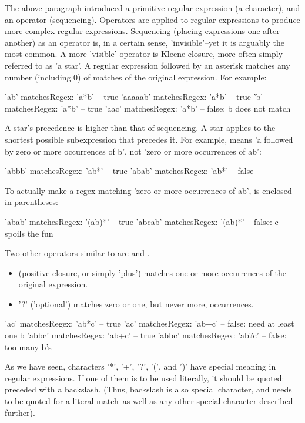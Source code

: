 \documentclass[a4paper,10pt,twoside]{book}
\begin{document}
 The above paragraph introduced a primitive regular expression (a character), and an operator (sequencing). Operators are applied to regular expressions to 
produce more complex regular expressions. Sequencing (placing expressions one 
after another) as an operator is, in a certain sense, 'invisible'--yet it is 
arguably the most common. A more 'visible' operator is Kleene closure, more 
often simply referred to as 'a star'.  A regular expression followed by an 
asterisk matches any number (including 0) of matches of the original 
expression. For example:
\begin{code}{} 	
'ab' matchesRegex: 'a*b'		 		-- true 
'aaaaab' matchesRegex: 'a*b'	 	-- true 	
'b' matchesRegex: 'a*b'		 		-- true 	
'aac' matchesRegex: 'a*b'	 		-- false: b does not match
\end{code}

 A star's precedence is higher than that of sequencing. A star applies to the 
shortest possible subexpression that precedes it. For example, 
means 'a followed by zero or more occurrences of b', not 'zero or more 
occurrences of ab':

\begin{code}{}
'abbb' matchesRegex: 'ab*'	 		-- true 
'abab' matchesRegex: 'ab*'		 	-- false
\end{code}

 To actually make a regex matching 'zero or more occurrences of ab',  is enclosed in parentheses:
\begin{code}{} 	
'abab' matchesRegex: '(ab)*'		 	-- true 	
'abcab' matchesRegex: '(ab)*'	 	-- false: c spoils the fun
\end{code} 

Two other operators similar to  are  and . 

\begin{itemize}
\item {} (positive closure, or simply 'plus') matches one or more occurrences of the original expression. 
\item '?' ('optional') matches zero or one, but never more, occurrences.
\end{itemize}

\begin{code}{} 	'ac' matchesRegex: 'ab*c'	 		-- true 	'ac' matchesRegex: 'ab+c'	 		-- false: need at least one b 	'abbc' matchesRegex: 'ab+c'		 	-- true 	'abbc' matchesRegex: 'ab?c'		 	-- false: too many b's
\end{code}
 As we have seen, characters '*', '+', '?', '(', and ')' have special meaning in regular expressions. If one of them is to be used literally, it should be quoted: preceded with a backslash. (Thus, backslash is also special character, and needs to be quoted for a literal match--as well as any other special character described further).
\end{document}
